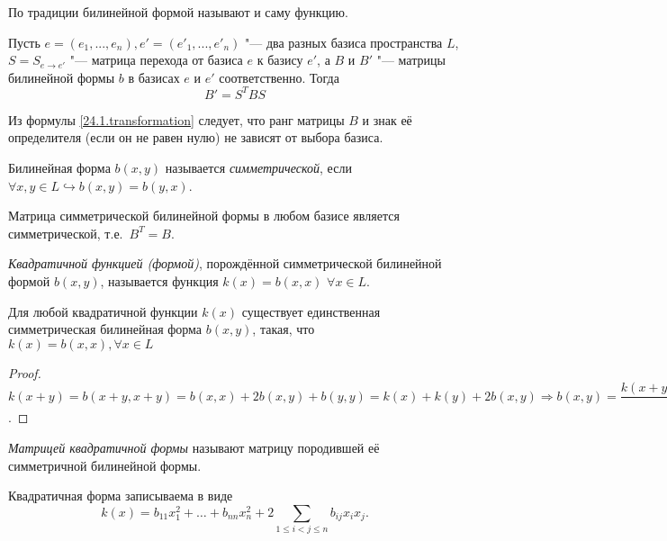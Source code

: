 \begin{notion} 
По традиции билинейной формой называют и саму функцию.
\end{notion}

\begin{stt}
Пусть $e=(e_1,...,e_n), e'=(e'_1,...,e'_n)$ "--- два разных базиса пространства $L$, $S=S_{e\rightarrow e'}$ "--- матрица перехода от базиса $e$ к базису $e'$, а $B$ и $B'$ "--- матрицы билинейной формы $b$ в базисах $e$ и $e'$ соответственно. Тогда 
\begin{equation}\label{24.1.transformation}
B'=S^TBS
\end{equation}

\end{stt}
Из формулы \eqref{24.1.transformation} следует, что ранг матрицы $B$ и знак её определителя (если он не равен нулю) не зависят от выбора базиса.
\begin{defn}
Билинейная форма $b(x,y)$ называется \textit{симметрической}, если $\forall x,y \in L \hookrightarrow b(x,y)=b(y,x)$.
\end{defn}
\begin{stt}
Матрица симметрической билинейной формы в любом базисе является симметрической, т.е.~$B^T=B$.
\end{stt}

\begin{defn}
\textit{Квадратичной функцией (формой)}, порождённой симметрической билинейной формой $ b(x,y) $, называется функция $k(x)=b(x,x)$  $\forall x \in L$.
\end{defn}
\begin{stt}
Для любой квадратичной функции $k(x)$ существует единственная симметрическая билинейная форма $b(x,y)$, такая, что $k(x)=b(x,x), \forall x \in L$
\end{stt}
\begin{proof}
$k(x+y)=b(x+y,x+y)=b(x,x)+2b(x,y)+b(y,y)=k(x)+k(y)+2b(x,y) \Rightarrow b(x,y)=\dfrac{k(x+y)-k(x)-k(y)}{2}$.
\end{proof}
\begin{defn}
\textit{Матрицей квадратичной формы} называют матрицу породившей её симметричной билинейной формы.
\end{defn}
Квадратичная форма записываема в виде 			  \begin{equation}\label{24.1.common}
k(x)=b_{11}x_1^2+\ldots+b_{nn}x_n^2+2\sum\limits_{1\le i<j\le n} b_{ij}x_ix_j.
\end{equation} 
